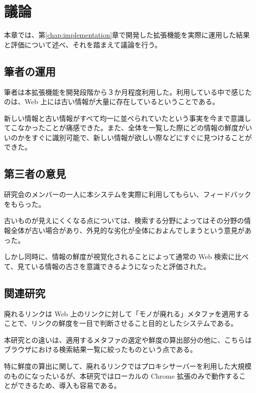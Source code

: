 \chapter{議論}
\label{chap:discussion}

本章では、第\ref{chap:implementation}章で開発した拡張機能を実際に運用した結果と評価について述べ、それを踏まえて議論を行う。

\newpage

\section{筆者の運用}

筆者は本拡張機能を開発段階から３か月程度利用した。利用している中で感じたのは、Web 上には古い情報が大量に存在しているということである。

新しい情報と古い情報がすべて均一に並べられていたという事実を今まで意識してこなかったことが痛感できた。また、全体を一覧した際にどの情報の鮮度がいいのかをすぐに識別可能で、新しい情報が欲しい際などにすぐに見つけることができた。

\section{第三者の意見}

研究会のメンバーの一人に本システムを実際に利用してもらい、フィードバックをもらった。

古いものが見えにくくなる点については、検索する分野によってはその分野の情報全体が古い場合があり、外見的な劣化が全体におよんでしまうという意見があった。

しかし同時に、情報の鮮度が視覚化されることによって通常の Web 検索に比べて、見ている情報の古さを意識できるようになったと評価された。

\section{関連研究}

廃れるリンク\cite{dyinglink}は Web 上のリンクに対して「モノが廃れる」メタファを適用することで、リンクの鮮度を一目で判断させること目的としたシステムである。

本研究との違いは、適用するメタファの選定や鮮度の算出部分の他に、こちらはブラウザにおける検索結果一覧に絞ったものという点である。

特に鮮度の算出に関して、廃れるリンクではプロキシサーバーを利用した大規模のものになったいるが、本研究ではローカルの Chrome 拡張のみで動作することができるため、導入も容易である。

